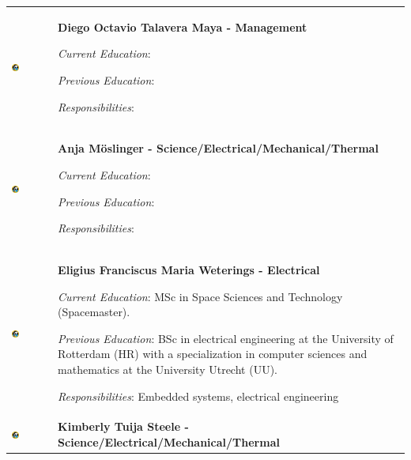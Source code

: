 
\begin{longtable}[]{m{} m{}}

\includegraphics[width=0.2\textwidth]{0-cover/img/logo-rexus-bexus.png} & \textbf{Diego Octavio Talavera Maya - Management}

\smallskip
\textit{Current Education}: 

\smallskip
\textit{Previous Education}:

\smallskip
\textit{Responsibilities}:  
\bigskip
\\

 \includegraphics[width=0.2\textwidth]{0-cover/img/logo-rexus-bexus.png}  & \textbf{Anja M\"oslinger - Science/Electrical/Mechanical/Thermal}

\smallskip
\textit{Current Education}: 

\smallskip
\textit{Previous Education}:

\smallskip
\textit{Responsibilities}:                           
\bigskip
\\

 \includegraphics[width=0.2\textwidth]{0-cover/img/logo-rexus-bexus.png}  & \textbf{Eligius Franciscus Maria Weterings - Electrical}

\smallskip
\textit{Current Education}: MSc in Space Sciences and Technology (Spacemaster).

\smallskip
\textit{Previous Education}: BSc in electrical engineering at the University of Rotterdam (HR) with a specialization in computer sciences and mathematics at the University Utrecht (UU). 

\smallskip
\textit{Responsibilities}: Embedded systems, electrical engineering
\bigskip
\\
 \includegraphics[width=0.2\textwidth]{0-cover/img/logo-rexus-bexus.png}  & \textbf{Kimberly Tuija Steele - Science/Electrical/Mechanical/Thermal}


\end{longtable}
